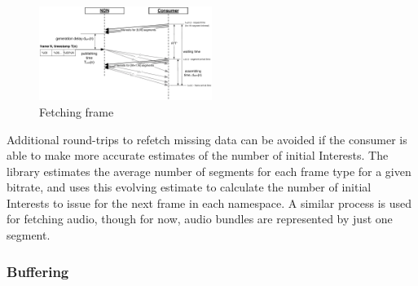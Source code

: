 \documentclass{icn/sig-alternate-2013} %
\begin{document}
\begin{figure}[t!]
\centering
\includegraphics[width=0.5\textwidth]{frame-fetch}
\vspace{-18pt}
\caption{Fetching frame}
\label{fig:pull}
\end{figure}

Additional round-trips to refetch missing data can be avoided if the consumer is able to make more accurate estimates of the number of initial Interests. The library estimates the average number of segments for each frame type for a given bitrate, and uses this evolving estimate to calculate the number of initial Interests to issue for the next frame in each namespace. %
A similar process is used for fetching audio, though for now, audio bundles are represented by just one segment.


\subsubsection{Buffering}

\end{document}

